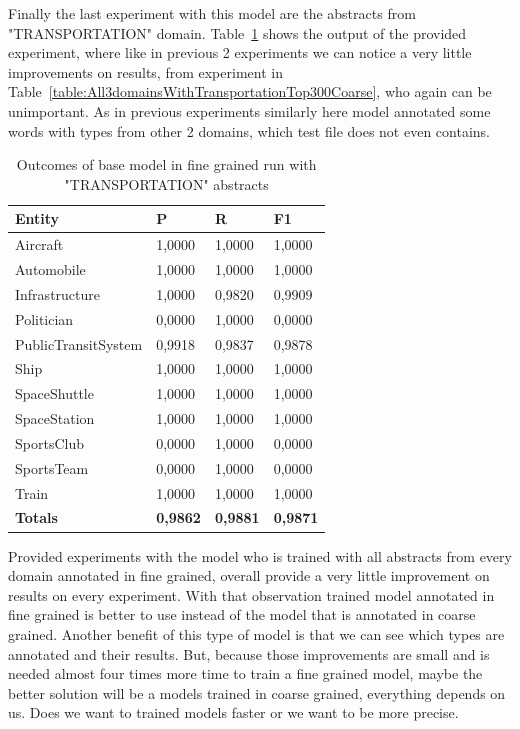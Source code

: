 \documentclass[thesis=M,english]{FITthesis}[2018/05/30]
\begin{document}
    Finally the last experiment with this model are the abstracts from "TRANSPORTATION" domain. Table~\ref{table:All3domainsWithTransportationTop300Fine} shows the output of the provided experiment, where like in previous 2 experiments we can notice a very little improvements on results, from experiment in Table~\ref{table:All3domainsWithTransportationTop300Coarse}, who again can be unimportant. As in previous experiments similarly here model annotated some words with types from other 2 domains, which test file does not even contains.

	\begin{table}[H]\centering
		\begin{tabular}{|l|l|l|l|}
			\hline {\textbf{Entity}} & {\textbf{P}} & {\textbf{R}} & {\textbf{F1}}\\\hline
				Aircraft & 1,0000 & 1,0000 & 1,0000\\
				Automobile & 1,0000 & 1,0000 & 1,0000\\				
				Infrastructure & 1,0000 & 0,9820 & 0,9909\\
				Politician & 0,0000 & 1,0000 & 0,0000\\				
				PublicTransitSystem & 0,9918 & 0,9837 & 0,9878\\
				Ship & 1,0000 & 1,0000 & 1,0000\\				
				SpaceShuttle & 1,0000 & 1,0000 & 1,0000\\
				SpaceStation & 1,0000 & 1,0000 & 1,0000\\
				SportsClub & 0,0000 & 1,0000 & 0,0000\\
				SportsTeam & 0,0000 & 1,0000 & 0,0000\\
				Train & 1,0000 & 1,0000 & 1,0000\\\hline
				\textbf{Totals} & \textbf{0,9862} & \textbf{0,9881} & \textbf{0,9871}\\\hline
		\end{tabular}
		\caption{Outcomes of base model in fine grained run with "TRANSPORTATION" abstracts\label{table:All3domainsWithTransportationTop300Fine}}
	\end{table}	
	
	Provided experiments with the model who is trained with all abstracts from every domain annotated in fine grained, overall provide a very little improvement on results on every experiment. With that observation trained model annotated in fine grained is better to use instead of the model that is annotated in coarse grained. Another benefit of this type of model is that we can see which types are annotated and their results. But, because those improvements are small and is needed almost four times more time to train a fine grained model, maybe the better solution will be a models trained in coarse grained, everything depends on us. Does we want to trained models faster or we want to be more precise. 
\end{document}
